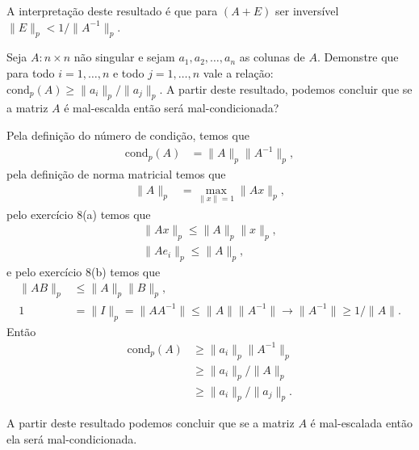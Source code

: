 \documentclass[a4paper,12pt, leqno, answers]{exam}
\begin{document}
\begin{questions}
\begin{solution}
        A interpreta\c{c}\~{a}o deste resultado \'{e} que para $\left( A + E \right)$ ser invers\'{i}vel $\| E \|_p < 1 / \| A^{-1} \|_p$.
    \end{solution}

    \question Seja $A : n \times n$ n\~{a}o singular e sejam $a_1, a_2, \ldots, a_n$ as colunas de $A$. Demonstre que para todo $i = 1, \ldots, n$ e todo $j = 1, \ldots, n$ vale a rela\c{c}\~{a}o: $\text{cond}_p (A) \geq \| a_i \|_p / \| a_j \|_p$. A partir deste resultado, podemos concluir que se a matriz $A$ \'{e} mal-escalda ent\~{a}o ser\'{a} mal-condicionada?
    \begin{solution}
        Pela defini\c{c}\~{a}o do n\'{u}mero de condi\c{c}\~{a}o, temos que
        \begin{align*}
            \text{cond}_p \left( A \right) &= \| A \|_p \| A^{-1} \|_p,
        \end{align*}
        pela defini\c{c}\~{a}o de norma matricial temos que
        \begin{align*}
            \| A \|_p &= \max_{\| x \| = 1} \| A x \|_p,
        \end{align*}
        pelo exerc\'{i}cio 8(a) temos que
        \begin{align*}
            \| A x \|_p \leq \| A \|_p \| x \|_p, \\
            \| A e_i \|_p \leq \| A \|_p,
        \end{align*}
        e pelo exerc\'{i}cio 8(b) temos que
        \begin{align*}
            \| A B \|_p &\leq \| A \|_p \| B \|_p, \\
            1 &= \| I \|_p = \| A A^{-1} \| \leq \| A \| \| A^{-1} \| \rightarrow \| A^{-1} \| \geq 1 / \| A \|.
        \end{align*}
        Ent\~{a}o
        \begin{align*}
            \text{cond}_p \left( A \right) &\geq \| a_i \|_p \| A^{-1} \|_p \\
            &\geq \| a_i \|_p / \| A \|_p \\
            &\geq \| a_i \|_p / \| a_j \|_p.
        \end{align*}

        A partir deste resultado podemos concluir que se a matriz $A$ \'{e} mal-escalada ent\~{a}o ela ser\'{a} mal-condicionada.
    \end{solution}
\end{questions}


\end{document}
